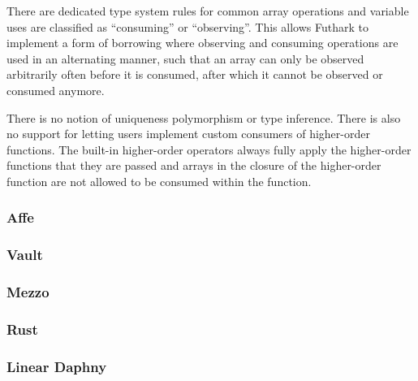 There are dedicated type system rules for common array operations and variable uses are classified as ``consuming'' or ``observing''. This allows Futhark to implement a form of borrowing where observing and consuming operations are used in an alternating manner, such that an array can only be observed arbitrarily often before it is consumed, after which it cannot be observed or consumed anymore.

There is no notion of uniqueness polymorphism or type inference. There is also no support for letting users implement custom consumers of higher-order functions. The built-in higher-order operators always fully apply the higher-order functions that they are passed and arrays in the closure of the higher-order function are not allowed to be consumed within the function.

\subsubsection{Affe}

\subsubsection{Vault}

\subsubsection{Mezzo}

\subsubsection{Rust}

\subsubsection{Linear Daphny}